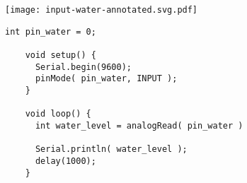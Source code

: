 \vspace{0.1in}
\begin{minipage}[t]{0.49\tw}
  \vspace{0pt}

  \texttt{[image: input-water-annotated.svg.pdf]}
\end{minipage}
\hfill
\begin{minipage}[t]{0.49\tw}
  \vspace{0.1in}
  \begin{Verbatim}[gobble=3,fontsize=\small]
    int pin_water = 0;

    void setup() {
      Serial.begin(9600);
      pinMode( pin_water, INPUT );
    }

    void loop() {
      int water_level = analogRead( pin_water )

      Serial.println( water_level );
      delay(1000);
    }
  \end{Verbatim}
\end{minipage}
\vspace{0.1in}

